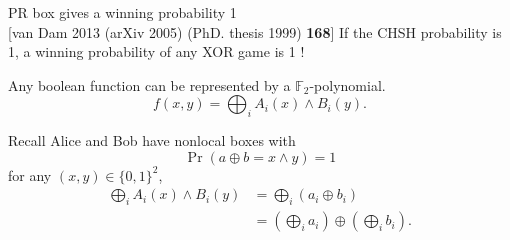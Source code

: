 \documentclass{beamer}
\newcommand\emm[1]{\textcolor{redorange}{{#1}}}
\newcommand\numc[1]{\textcolor{citation}{{\bf #1}}}
\begin{document}
\begin{frame}{PR box gives a winning probability 1\\{\normalsize [van Dam 2013 {\small (arXiv 2005) (PhD. thesis 1999)} \numc{168}]}}
If the CHSH probability is 1, a winning probability of \emm{any XOR game} is \emm{1} !

\vspace{1em}
Any boolean function can be represented by a $\mathbb{F}_2$-polynomial.
\begin{equation*}
f(x,y) = \bigoplus_i A_i(x) \wedge B_i(y).
\end{equation*}


Recall Alice and Bob have nonlocal boxes with
\begin{equation*}
\Pr(a \oplus b = x\wedge y) = 1
\end{equation*}
for any $(x,y)\in\{0,1\}^2$,
%
\begin{align*}
\bigoplus_i A_i(x) \wedge B_i(y)
&= \bigoplus_i (a_i \oplus b_i)\\
&= \left(\bigoplus_i a_i\right) \oplus \left(\bigoplus_i b_i\right).
\end{align*}
\end{frame}
\end{document}
